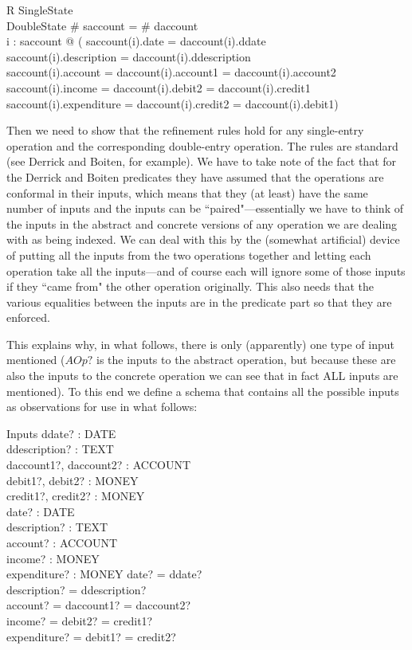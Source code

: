 \documentclass[11pt]{amsart}
\begin{document}
\begin{schema}{R}
SingleState\\
DoubleState
\where
\# saccount = \# daccount\\
\forall i : \dom saccount @ (
saccount(i).date = daccount(i).ddate \land\\
saccount(i).description = daccount(i).ddescription \land\\
saccount(i).account = daccount(i).account1 = daccount(i).account2 \land\\
saccount(i).income = daccount(i).debit2  = daccount(i).credit1 \land\\
saccount(i).expenditure = daccount(i).credit2 = daccount(i).debit1)
\end{schema}

Then we need to show that the refinement rules hold for any single-entry operation and the  corresponding double-entry operation. The rules are standard (see Derrick and Boiten, for example). We have to take note of the fact that for the Derrick and Boiten predicates they have assumed that the operations are conformal in their inputs, which means that they (at least) have the same number of inputs and the inputs can be ``paired"---essentially we have to think of the inputs in the abstract and concrete versions of any operation we are dealing with as being indexed. We can deal with this by the (somewhat artificial) device of putting all the inputs from the two operations together and letting each operation take all the inputs---and of course each will ignore some of those inputs if they ``came from" the other operation originally. This also needs that the various equalities between the inputs are in the predicate part so that they are enforced. 

This explains why, in what follows, there is only (apparently) one type of input mentioned ($AOp?$ is the inputs to the abstract operation, but because these are also the inputs to the concrete operation we can see that in fact ALL inputs are mentioned). To this end we define a schema that contains all the possible inputs as observations for use in what follows:

\begin{schema}{Inputs}
ddate? : DATE\\
ddescription? : TEXT\\
daccount1?, daccount2? : ACCOUNT\\ 
debit1?, debit2? : MONEY\\
credit1?, credit2? : MONEY\\
date? : DATE\\
description? : TEXT\\
account? : ACCOUNT\\ 
income? : MONEY\\
expenditure? : MONEY
\where
date? = ddate? \\
description? = ddescription?\\
account? = daccount1? = daccount2?\\
income? = debit2? = credit1?\\
expenditure? = debit1? = credit2?
\end{schema}
\end{document}

